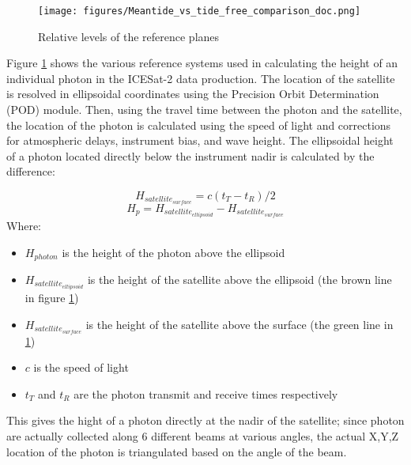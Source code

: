 \begin{figure}[h]
      \centering
      \texttt{[image: figures/Meantide\_vs\_tide\_free\_comparison\_doc.png]}
      \caption{Relative levels of the reference planes}
      \label{fig:geoids-ellipsoids-graphics}
\end{figure}

Figure \ref{fig:geoids-ellipsoids-graphics} shows the various reference systems used in calculating the height of an individual photon in the ICESat-2 data production. The location of the satellite is resolved in ellipsoidal coordinates using the Precision Orbit Determination (POD) module. Then, using the travel time between the photon and the satellite, the location of the photon is calculated using the speed of light and corrections for atmospheric delays, instrument bias, and wave height. The ellipsoidal height of a photon located directly below the instrument nadir is calculated by the difference:


\begin{equation}\label{eq:raw_photon_calculation}
      H_{satellite_{surface}} = c(t_T-t_R)/2
\end{equation}
\begin{equation}
      H_p = H_{satellite_{ellipsoid}} - H_{satellite_{surface}}
\end{equation}
Where:
\begin{itemize}
      \item $H_{photon}$ is the height of the photon above the ellipsoid
      \item $H_{satellite_{ellipsoid}}$ is the height of the satellite above the ellipsoid (the brown line in figure \ref{fig:geoids-ellipsoids-graphics})
      \item $H_{satellite_{surface}}$ is the height of the satellite above the surface (the green line in \ref{fig:geoids-ellipsoids-graphics})
      \item $c$ is the speed of light
      \item $t_T$ and $t_R$ are the photon transmit and receive times respectively
\end{itemize}

This gives the hight of a photon directly at the nadir of the satellite; since photon are actually collected along 6 different beams at various angles, the actual X,Y,Z location of the photon is triangulated based on the angle of the beam. 

